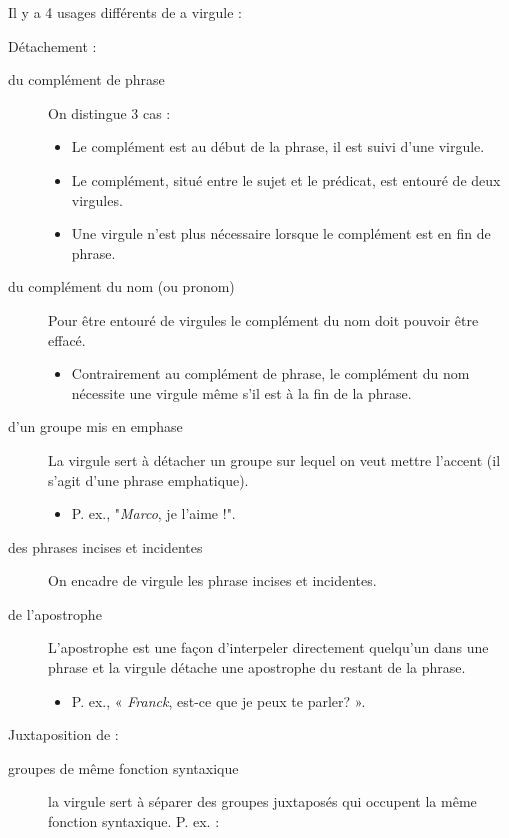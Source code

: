 \documentclass[10pt, french]{article}
\begin{document}
\begin{multicols*}{2}
\begin{definitionNOHFILL}[La virgule]
Il y a 4 usages différents de a virgule : 
\begin{definitionNOHFILLpropos}[Le détachement]
Détachement : 
\begin{description}
	\item[du complément de phrase]	On distingue 3 cas : 
		\begin{itemize}
		\item	Le complément est au début de la phrase, il est suivi d'une virgule.
		\item	Le complément, situé entre le sujet et le prédicat, est entouré de deux virgules.
		\item	Une virgule n'est plus nécessaire lorsque le complément est en fin de phrase.
		\end{itemize}
	\item[du complément du nom (ou pronom)]	Pour être entouré de virgules le complément du nom doit pouvoir être effacé.
		\begin{itemize}
		\item	Contrairement au complément de phrase, le complément du nom nécessite une virgule même s'il est à la fin de la phrase.
		\end{itemize}
	\item[d'un groupe mis en emphase]	La virgule sert à détacher un groupe sur lequel on veut mettre l'accent (il s'agit d'une phrase emphatique).
		\begin{itemize}
		\item	P. ex., "\textit{Marco}, je l'aime !".
		\end{itemize}
	\item[des phrases incises et incidentes]	On encadre de virgule les phrase incises et incidentes.
	\item[de l'apostrophe]	L'apostrophe est une façon d'interpeler directement quelqu'un dans une phrase et la virgule détache une apostrophe du restant de la phrase.
		\begin{itemize}
		\item	P. ex., « \textit{Franck}, est-ce que je peux te parler? ».
		\end{itemize}
\end{description}
\end{definitionNOHFILLpropos}
\begin{definitionNOHFILLpropos}[La juxtaposition]
Juxtaposition de :
\begin{description}
	\item[groupes de même fonction syntaxique]	la virgule sert à séparer des groupes juxtaposés qui occupent la même fonction syntaxique. P. ex. :

\end{description}
\end{definitionNOHFILLpropos}
\end{definitionNOHFILL}
\end{multicols*}
\end{document}
